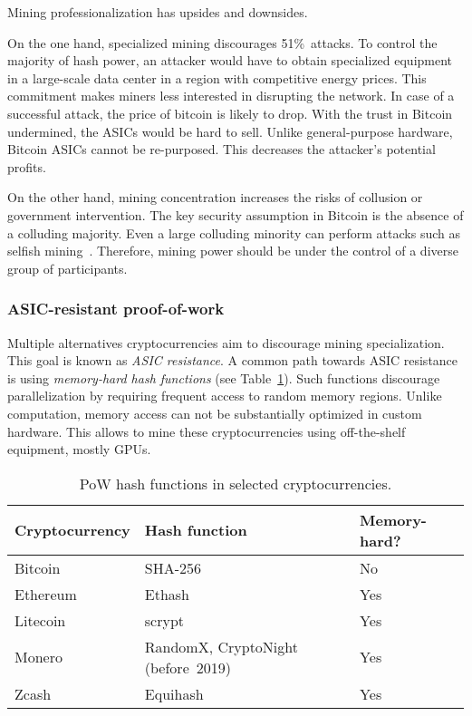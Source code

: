 Mining professionalization has upsides and downsides.

On the one hand, specialized mining discourages 51\%~attacks.
To control the majority of hash power, an attacker would have to obtain specialized equipment in a large-scale data center in a region with competitive energy prices.
This commitment makes miners less interested in disrupting the network.
In case of a successful attack, the price of bitcoin is likely to drop.
With the trust in Bitcoin undermined, the ASICs would be hard to sell.
Unlike general-purpose hardware, Bitcoin ASICs cannot be re-purposed.
This decreases the attacker's potential profits.

On the other hand, mining concentration increases the risks of collusion or government intervention.
The key security assumption in Bitcoin is the absence of a colluding majority.
Even a large colluding minority can perform attacks such as selfish mining~\cite{Eyal2018}.
Therefore, mining power should be under the control of a diverse group of participants.


\subsubsection*{ASIC-resistant proof-of-work}

Multiple alternatives cryptocurrencies aim to discourage mining specialization.
This goal is known as \textit{ASIC resistance}.
A common path towards ASIC resistance is using \textit{memory-hard hash functions} (see Table~\ref{tab:pow-coins-hash-functions}).
Such functions discourage parallelization by requiring frequent access to random memory regions.
Unlike computation, memory access can not be substantially optimized in custom hardware.
This allows to mine these cryptocurrencies using off-the-shelf equipment, mostly GPUs.

\begin{table}[]
	\caption{PoW hash functions in selected cryptocurrencies.}
	\begin{tabular}{|l|l|l|}
		\hline
		\textbf{Cryptocurrency} & \textbf{Hash function} & \textbf{Memory-hard?} \\ \hline
		Bitcoin & SHA-256 & No \\ \hline
		Ethereum & Ethash & Yes \\ \hline
		Litecoin & scrypt & Yes \\ \hline
		Monero & RandomX, CryptoNight (before~2019) & Yes \\ \hline
		Zcash & Equihash & Yes \\ \hline
	\end{tabular}
	\label{tab:pow-coins-hash-functions}
\end{table}

